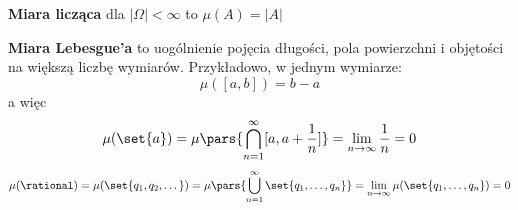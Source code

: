 \begin{example}
	\textbf{Miara licząca} dla \(|\Omega| < \infty\) to \(\mu(A) = |A|\)
\end{example}

\begin{example}
	\textbf{Miara Lebesgue'a} to uogólnienie pojęcia długości, pola powierzchni i objętości na większą liczbę wymiarów. Przykładowo, w jednym wymiarze:
	\[
		\mu([a, b]) = b - a
	\]
	a więc
	\[
		\mu(\set{a}) = \mu\pars{\bigcap_{n=1}^\infty [a, a + \frac{1}{n}]} = \lim_{n \to \infty} \frac{1}{n} = 0
	\]
	\[
		\mu(\rational) = \mu(\set{q_1, q_2, \dots}) = \mu\pars{\bigcup_{n=1}^\infty \set{q_1, \dots, q_n}} = \lim_{n \to \infty} \mu(\set{q_1, \dots, q_n}) = 0
	\]
\end{example}
